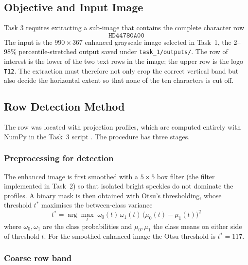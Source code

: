 \subsection{Objective and Input Image}

Task 3 requires extracting a sub-image that contains the complete character
row
\begin{equation}
  \texttt{HD44780A00}
  \label{eq:task3-target-string}
\end{equation}
The input is the $990\times367$ enhanced grayscale image selected in Task~1,
the 2--98\% percentile-stretched output saved under \texttt{task\_1/outputs/}.
The row of interest is the lower of the two text rows in the image; the upper
row is the logo \texttt{T12}.  The extraction must therefore not only crop the
correct vertical band but also decide the horizontal extent so that none of
the ten characters is cut off.

\subsection{Row Detection Method}

The row was located with projection profiles, which are computed entirely with
NumPy in the Task~3 script .  The procedure has three
stages.

\subsubsection{Preprocessing for detection}

The enhanced image is first smoothed with a $5\times5$ box filter (the filter
implemented in Task~2) so that isolated bright speckles do not dominate the
profiles.  A binary mask is then obtained with Otsu's thresholding, whose
threshold $t^{*}$ maximises the between-class variance
\begin{equation}
  t^{*} =
  \arg\max_{t}\;
  \omega_0(t)\,\omega_1(t)\,
  \bigl(\mu_0(t)-\mu_1(t)\bigr)^{2}
  \label{eq:task3-otsu}
\end{equation}
where $\omega_0,\omega_1$ are the class probabilities and $\mu_0,\mu_1$ the
class means on either side of threshold $t$.  For the smoothed enhanced image
the Otsu threshold is $t^{*}=117$.

\subsubsection{Coarse row band}

